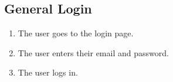 \subsection{General Login}

\begin{enumerate}
    \item The user goes to the login page.
    \item The user enters their email and password.
    \item The user logs in.
\end{enumerate}